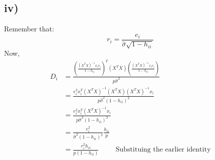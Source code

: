 \documentclass{article}
\begin{document}
\subsection*{iv)}
Remember that:
$$ r_i = \frac{e_i}{\hat{\sigma}\sqrt{1 - h_{ii}}}$$
Now,
\begin{align*}
    D_{i} &= \frac{\left(\frac{(X^TX)^{-1}x_{i}e_i}{1 - h_{ii}}\right)^T(X^TX)\left(\frac{(X^TX)^{-1}x_ie_i}{1-h_{ii}}\right)}{p\hat{\sigma}^2} \\
    &= \frac{e_i^2x_i^T(X^TX)^{-1}(X^TX)(X^TX)^{-1}x_i}{p\hat{\sigma}^2(1-h_{ii})^2} \\ 
    &= \frac{e_i^2x_i^T(X^TX)^{-1}x_i}{p\hat{\sigma}^2(1-h_{ii})^2} \\ 
    &= \frac{e_i^2}{\hat{\sigma}^2(1-h_{ii})^2}\frac{h_{ii}}{p} \\ 
    &= \frac{r_i^2h_{ii}}{p(1-h_{ii})} \hspace{1cm} \text{Substituing the earlier identity}
\end{align*}
\end{document}
